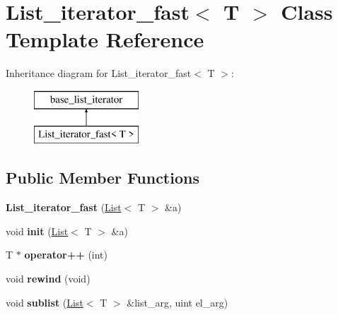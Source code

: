 \hypertarget{classList__iterator__fast}{}\section{List\+\_\+iterator\+\_\+fast$<$ T $>$ Class Template Reference}
\label{classList__iterator__fast}
Inheritance diagram for List\+\_\+iterator\+\_\+fast$<$ T $>$\+:\begin{figure}[H]
\begin{center}
\leavevmode
\includegraphics[height=2.000000cm]{classList__iterator__fast}
\end{center}
\end{figure}
\subsection*{Public Member Functions}
\begin{DoxyCompactItemize}
\item 
\mbox{\label{classList__iterator__fast_a1a1b15693ea889693e7ac3694c9ba518}} 
{\bfseries List\+\_\+iterator\+\_\+fast} (\mbox{\hyperlink{classList}{List}}$<$ T $>$ \&a)
\item 
\mbox{\label{classList__iterator__fast_a75514e89dcb781b17c982893048d9307}} 
void {\bfseries init} (\mbox{\hyperlink{classList}{List}}$<$ T $>$ \&a)
\item 
\mbox{\label{classList__iterator__fast_a3fed718ed4a0a3d8bfca1385111aa5c4}} 
T $\ast$ {\bfseries operator++} (int)
\item 
\mbox{\label{classList__iterator__fast_a8d5c1fdd70bd41d599ea63ba5d8086be}} 
void {\bfseries rewind} (void)
\item 
\mbox{\label{classList__iterator__fast_a69b475ddf2aed0d2fe315210f5cda288}} 
void {\bfseries sublist} (\mbox{\hyperlink{classList}{List}}$<$ T $>$ \&list\+\_\+arg, uint el\+\_\+arg)
\end{DoxyCompactItemize}
